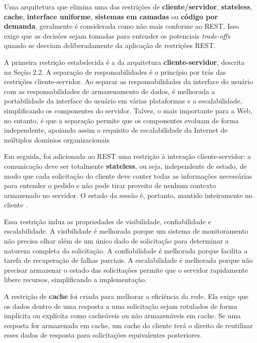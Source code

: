 Uma arquitetura que elimina uma das restrições de \textbf{cliente/servidor}, \textbf{stateless}, \textbf{cache}, \textbf{interface uniforme}, \textbf{sistemas em camadas} ou \textbf{código por demanda}, geralmente é considerada como não mais conforme ao REST. Isso exige que as decisões sejam tomadas para entender os potenciais \textit{trade-offs} quando se desviam deliberadamente da aplicação de restrições REST. 

A primeira restrição estabelecida é a da arquitetura \textbf{cliente-servidor}, descrita na Seção 2.2. A separação de responsabilidades é o princípio por trás das restrições cliente-servidor. Ao separar as responsabilidades da interface do usuário com as responsabilidades de armazenamento de dados, é melhorada a portabilidade da interface do usuário em várias plataformas e a escalabilidade, simplificando os componentes do servidor. Talvez, o mais importante para a Web, no entanto, é que a separação permite que os componentes evoluam de forma independente, apoiando assim o requisito de escalabilidade da Internet de múltiplos domínios organizacionais \cite{rest-thesis}

Em seguida, foi adicionada ao REST uma restrição à interação cliente-servidor: a comunicação deve ser totalmente \textbf{stateless}, ou seja, independente de estado, de modo que cada solicitação do cliente deve conter todas as informações necessárias para entender o pedido e não pode tirar proveito de nenhum contexto armazenado no servidor. O estado da sessão é, portanto, mantido inteiramente no cliente \cite{rest-thesis}.

Essa restrição induz as propriedades de visibilidade, confiabilidade e escalabilidade. A visibilidade é melhorada porque um sistema de monitoramento não precisa olhar além de um único dado de solicitação para determinar a natureza completa da solicitação. A confiabilidade é melhorada porque facilita a tarefa de recuperação de falhas parciais. A escalabilidade é melhorada porque não precisar armazenar o estado das solicitações permite que o servidor rapidamente libere recursos, simplificando a implementação.

A restrição de \textbf{cache} foi criada para melhorar a eficiência da rede. Ela exige que os dados dentro de uma resposta a uma solicitação sejam rotulados de forma implícita ou explícita como cacheáveis ou não armazenáveis em cache. Se uma resposta for armazenada em cache, um cache do cliente terá o direito de reutilizar esses dados de resposta para solicitações equivalentes posteriores.

